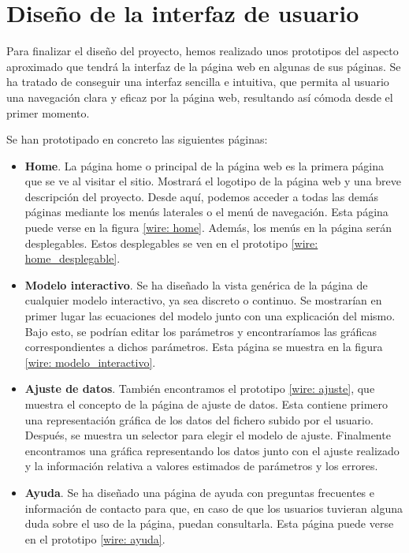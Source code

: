 
\section{Diseño de la interfaz de usuario}

Para finalizar el diseño del proyecto, hemos realizado unos prototipos del aspecto aproximado que tendrá la interfaz de la página web en algunas de sus páginas. Se ha tratado de conseguir una interfaz sencilla e intuitiva, que permita al usuario una navegación clara y eficaz por la página web, resultando así cómoda desde el primer momento.

Se han prototipado en concreto las siguientes páginas:

\begin{itemize}
\item \textbf{Home}. La página home o principal de la página web es la primera página que se ve al visitar el sitio. Mostrará el logotipo de la página web y una breve descripción del proyecto. Desde aquí, podemos acceder a todas las demás páginas mediante los menús laterales o el menú de navegación. Esta página puede verse en la figura \ref{wire: home}. Además, los menús en la página serán desplegables. Estos desplegables se ven en el prototipo \ref{wire: home_desplegable}.
\item \textbf{Modelo interactivo}. Se ha diseñado la vista genérica de la página de cualquier modelo interactivo, ya sea discreto o continuo. Se mostrarían en primer lugar las ecuaciones del modelo junto con una explicación del mismo. Bajo esto, se podrían editar los parámetros y encontraríamos las gráficas correspondientes a dichos parámetros. Esta página se muestra en la figura \ref{wire: modelo_interactivo}.
\item \textbf{Ajuste de datos}. También encontramos el prototipo \ref{wire: ajuste}, que muestra el concepto de la página de ajuste de datos. Esta contiene primero una representación gráfica de los datos del fichero subido por el usuario. Después, se muestra un selector para elegir el modelo de ajuste. Finalmente encontramos una gráfica representando los datos junto con el ajuste realizado y la información relativa a valores estimados de parámetros y los errores.
\item \textbf{Ayuda}. Se ha diseñado una página de ayuda con preguntas frecuentes e información de contacto para que, en caso de que los usuarios tuvieran alguna duda sobre el uso de la página, puedan consultarla. Esta página puede verse en el prototipo \ref{wire: ayuda}.
\end{itemize}



